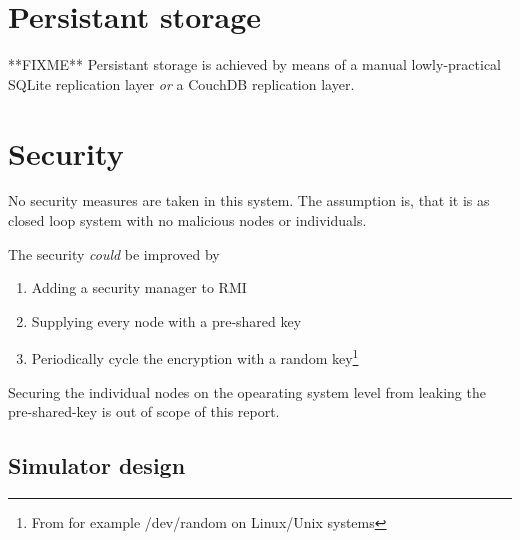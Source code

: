 \documentclass[10pt,a4paper]{article}
\begin{document}
\section{Persistant storage}
**FIXME** Persistant storage is achieved by means of a manual lowly-practical SQLite replication layer \emph{or} a CouchDB replication layer.

\section{Security}
No security measures are taken in this system. The assumption is, that it is as closed loop system with no malicious nodes or individuals.

The security \emph{could} be improved by 
\begin{enumerate}
\item Adding a security manager to RMI
\item Supplying every node with a pre-shared key
\item Periodically cycle the encryption with a random key\footnote{From for example /dev/random on Linux/Unix systems}
\end{enumerate}
Securing the individual nodes on the opearating system level from leaking the pre-shared-key is out of scope of this report.

\subsection{Simulator design}
\end{document}
